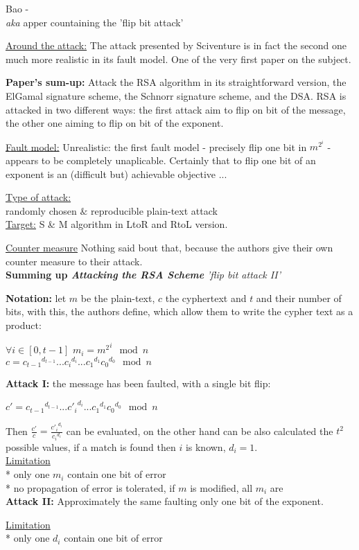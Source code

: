 \item Bao -  \\
\textit{aka} apper countaining the 'flip bit attack'

\underline{Around the attack:}
The attack presented by Sciventure is in fact the second one much more 
realistic in its fault model. One of the very first paper on the subject.

\textbf{Paper's sum-up:}
Attack the RSA algorithm in its straightforward version, the ElGamal signature
scheme, the Schnorr signature scheme, and the DSA. 
RSA is attacked in two different ways: the first attack aim to flip on bit of the
message, the other one aiming to flip on bit of the exponent.

\underline{Fault model:}
Unrealistic: the first fault model - precisely flip one bit  in $m^{2^i}$ -
appears to be completely unaplicable. Certainly that to flip one bit of an 
exponent is an (difficult but) achievable objective ...

\underline{Type of attack:}\\
randomly chosen $\&$ reproducible plain-text attack\\

\underline{Target:} S \& M algorithm in LtoR and RtoL version.

\underline{Counter measure}
Nothing said bout that, because the authors give 
their own counter measure to their attack.\\

\textbf{Summing up \textit{ Attacking the RSA Scheme}}
 \textit{'flip bit attack II'}

\textbf{Notation:} let $m$ be the plain-text, $c$ the cyphertext and $t$ and
their number of bits, with this, the authors define, which allow them to 
write the cypher text as a product:
\begin{center}
$\forall i \in [0,t-1]$ $m_i = {m^2}^i \mod n$\\
$c ={c_{t-1}}^{d_{t-1}}...{c_i}^{d_i}...{c_1}^{d_1}{c_0}^{d_0} \mod n$
\end{center}
\textbf{Attack I:}
the message has been faulted, with a single bit flip:
\begin{center}
$c' ={c_{t-1}}^{d_{t-1}}...{c'_i}^{d_i}...{c_1}^{d_1}{c_0}^{d_0} \mod n$
\end{center}
Then 
$ \frac{c'}{c} = \frac{{c'_i}^{d_i}}{{c_i}^{d_i}} $ can be evaluated, 
on the other hand can be also calculated the $t^2$ possible values,
if a match is found then $i$ is known, $d_i=1$.\\
\underline{Limitation}\\
* only one $m_i$ contain one bit of error \\
* no propagation of error is tolerated, if $m$ is modified, all $m_i$ are\\

\textbf{Attack II:}
Approximately the same faulting only one bit of the exponent.

\underline{Limitation}\\
* only one $d_i$ contain one bit of error \\


